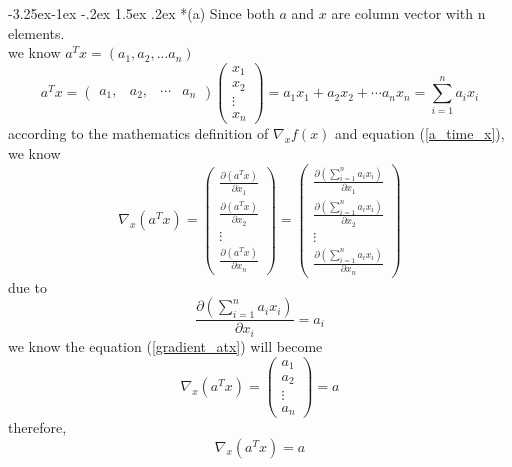 \documentclass[12pt]{article}
\makeatletter
\renewcommand\subsection{\@startsection{subsection}{2}{\z@}%
	{-3.25ex\@plus -1ex \@minus -.2ex}%
	{1.5ex \@plus .2ex}%
	{\normalfont\large\bfseries}}%
\makeatother
\begin{document}
	\subsection*{(a)}
	Since both $a$ and $x$ are column vector with n elements.\\
	we know $a^{T}x = (a_1, a_2, ... a_n)$
	\begin{equation}\label{a_time_x}
	a^{T}x=  
	\left(  
	\begin{array}{cccc}  
	a_{1}, &  
	a_{2}, &   
	\cdots &  
	a_{n}  
	\end{array}  
	\right)  
	\left(  
	\begin{array}{c}  
	x_{1} \\   
	x_{2} \\  
	\vdots \\  
	x_{n}  
	\end{array}  
	\right)
	=a_1x_1+a_2x_2+\cdots a_nx_n
	= \sum_{i=1}^n a_i x_i
	\end{equation}
	according to the mathematics definition of $\nabla_xf(x)$ and equation (\ref{a_time_x}), we know
	\begin{equation}\label{gradient_atx}
	\nabla_x(a^Tx)=
	\left(  
	\begin{array}{c}  
	\frac{\partial(a^Tx)}{\partial x_1} \\
	\frac{\partial(a^Tx)}{\partial x_2} \\
	\vdots \\
	\frac{\partial(a^Tx)}{\partial x_n} 
	\end{array}
	\right)
	=
	\left(  
	\begin{array}{c}  
	\frac{\partial(\sum_{i=1}^n a_i x_i)}{\partial x_1} \\
	\frac{\partial(\sum_{i=1}^n a_i x_i)}{\partial x_2} \\
	\vdots \\
	\frac{\partial(\sum_{i=1}^n a_i x_i)}{\partial x_n} 
	\end{array}
	\right)
	\end{equation}
	due to
	\begin{equation}\label{gradient_atx_i}
	\frac{\partial(\sum_{i=1}^n a_i x_i)}{\partial x_i}=a_i
	\end{equation}
	we know the equation (\ref{gradient_atx}) will become
	\begin{equation}\label{gradient_atx_final}
	\nabla_x(a^Tx)=
	\left(  
	\begin{array}{c}  
	a_1 \\
	a_2 \\
	\vdots \\
	a_n 
	\end{array}
	\right)
	= a
	\end{equation}
	therefore, $$\nabla_x(a^Tx)=a$$
	
\end{document}
